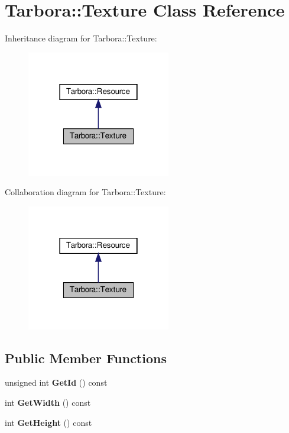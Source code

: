 \hypertarget{classTarbora_1_1Texture}{}\section{Tarbora\+:\+:Texture Class Reference}
\label{classTarbora_1_1Texture}


Inheritance diagram for Tarbora\+:\+:Texture\+:\nopagebreak
\begin{figure}[H]
\begin{center}
\leavevmode
\includegraphics[width=178pt]{classTarbora_1_1Texture__inherit__graph}
\end{center}
\end{figure}


Collaboration diagram for Tarbora\+:\+:Texture\+:\nopagebreak
\begin{figure}[H]
\begin{center}
\leavevmode
\includegraphics[width=178pt]{classTarbora_1_1Texture__coll__graph}
\end{center}
\end{figure}
\subsection*{Public Member Functions}
\begin{DoxyCompactItemize}
\item 
\mbox{\label{classTarbora_1_1Texture_a4a267559fb158d84fb818b678d08cd4a}} 
unsigned int {\bfseries Get\+Id} () const
\item 
\mbox{\label{classTarbora_1_1Texture_ad5c80665c136cedb3f6309a107301d25}} 
int {\bfseries Get\+Width} () const
\item 
\mbox{\label{classTarbora_1_1Texture_ada12e9f0bf570b36ba98ba90e9ff1d11}} 
int {\bfseries Get\+Height} () const
\end{DoxyCompactItemize}
